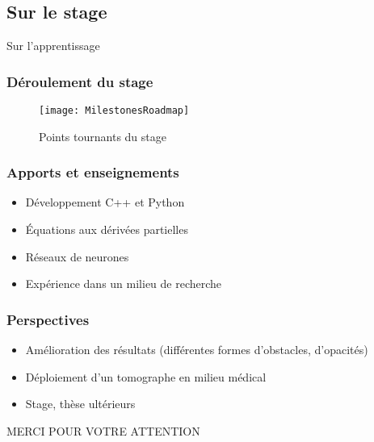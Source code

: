 \subsection{Sur le stage}

\begin{frame}
    \large
    \centering
    Sur l'apprentissage
\end{frame}

\begin{frame}
    \frametitle{Déroulement du stage}
    \begin{figure}
        \texttt{[image: MilestonesRoadmap]}       
        \caption{Points tournants du stage}
    \end{figure}
\end{frame}

\begin{frame}
    \frametitle{Apports et enseignements}
    \begin{itemize}[<+>]
        \item Développement C++ et Python   %
        \item Équations aux dérivées partielles %
        \item Réseaux de neurones %
        \item Expérience dans un milieu de recherche %
    \end{itemize}
\end{frame}

\begin{frame}[<+>]
    \frametitle{Perspectives}
    \begin{itemize}
        \item Amélioration des résultats (différentes formes d'obstacles, d'opacités)
        \item Déploiement d'un tomographe en milieu médical
        \item Stage, thèse ultérieurs
    \end{itemize}
\end{frame}

\begin{frame}
    \large
    \centering
    MERCI POUR VOTRE ATTENTION
\end{frame}

% 

